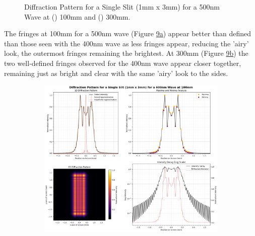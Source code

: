 \documentclass[12pt]{article}
\begin{document}
\begin{figure}[H]
\begin{subfigure}[b]{.48\textwidth}
        \label{fig:9b}
    \end{subfigure}
    \caption{Diffraction Pattern for a Single Slit (1mm x 3mm) for a 500nm Wave at () 100mm and () 300mm.}
    \label{fig:9}
\end{figure}

The fringes at 100mm for a 500nm wave (Figure \hyperref[fig:9a]{9a}) appear better than defined than those seen with the 400nm wave as less fringes appear, reducing the 'airy' look, the outermost fringes remaining the brightest.
At 300mm (Figure \hyperref[fig:9b]{9b}) the two well-defined fringes observed for the 400nm wave appear closer together, remaining just as bright and clear with the same 'airy' look to the sides.

\begin{figure}[H]
    \centering
    \begin{subfigure}[b]{.48\textwidth}
        \centering
        \includegraphics[width=\linewidth]{vsslit_600nm_100mm.png}
        \label{fig:10a}
    \end{subfigure}
    \hspace{-.5em}
    \begin{subfigure}[b]{.48\textwidth}
        \centering

\end{subfigure}
\end{figure}
\end{document}
